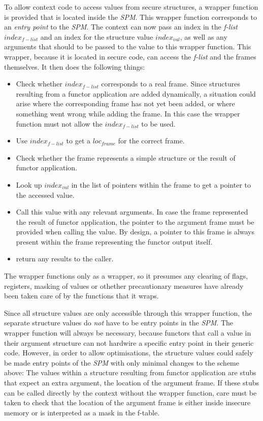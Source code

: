 \documentclass[10pt,a4paper,master=cws, masteroption=ai,english,inputenc=utf8]{kulemt}
\begin{document}
To allow context code to access values from secure structures, a wrapper function is provided that is located inside the \emph{SPM}.
This wrapper function corresponds to an \emph{entry point} to the \emph{SPM}.
The context can now pass an index in the \emph{f-list} $index_{f-list}$ and an index for the structure value $index_{val}$, as well as any arguments that should to be passed to the value to this wrapper function.
This wrapper, because it is located in secure code, can access the \emph{f-list} and the frames themselves.
It then does the following things:
\begin{itemize}
\item Check whether $index_{f-list}$ corresponds to a real frame.
Since structures resulting from a functor application are added dynamically, a situation could arise where the corresponding frame has not yet been added, or where something went wrong while adding the frame.
In this case the wrapper function must not allow the $index_{f-list}$ to be used.
\item Use $index_{f-list}$ to get a $loc_{frame}$ for the correct frame.
\item Check whether the frame represents a simple structure or the result of functor application.
\item Look up $index_{val}$ in the list of pointers within the frame to get a pointer to the accessed value.
\item Call this value with any relevant arguments.
In case the frame represented the result of functor application, the pointer to the argument frame must be provided when calling the value.
By design, a pointer to this frame is always present within the frame representing the functor output itself.
\item return any results to the caller.
\end{itemize}

The wrapper functions only as a wrapper, so it presumes any clearing of flags, registers, masking of values or othether precautionary measures have already been taken care of by the functions that it wraps.

Since all structure values are only accessible through this wrapper function, the separate structure values do \emph{not} have to be entry points in the \emph{SPM}. The wrapper function will always be necessary, because functors that call a value in their argument structure can not hardwire a specific entry point in their generic code.
However, in order to allow optimisations, the structure values could safely be made entry points of the \emph{SPM} with only minimal changes to the scheme above: The values within a structure resulting from functor application are stubs that expect an extra argument, the location of the argument frame. 
If these stubs can be called directly by the context without the wrapper function, care must be taken to check that the location of the argument frame is either inside insecure memory or is interpreted as a mask in the f-table.
\end{document}
